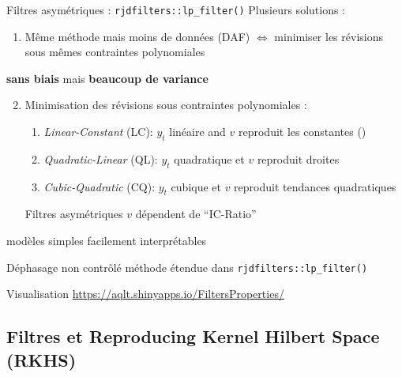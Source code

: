 \documentclass[10pt,xcolor=table,color={dvipsnames,usenames},ignorenonframetext,usepdftitle=false,french]{beamer}
\providecommand{\tightlist}{%
  \setlength{\parskip}{0pt}
  }
\newcommand\1{\mathds{1}}
\begin{document}
\begin{frame}[fragile]{Filtres asymétriques :
\texttt{rjdfilters::lp\_filter()}}
\protect\hypertarget{filtres-asymuxe9triques-rjdfilterslp_filter}{}
Plusieurs solutions :

\begin{enumerate}
\tightlist
\item
  Même méthode mais moins de données (DAF) \(\iff\) minimiser les
  révisions sous mêmes contraintes polynomiales
\end{enumerate}

\faArrowCircleRight{} \textbf{sans biais} mais \textbf{beaucoup de
variance}

\pause

\begin{enumerate}
\setcounter{enumi}{1}
\item
  Minimisation des révisions sous contraintes polynomiales :

  \begin{enumerate}
  \item
    \emph{Linear-Constant} (LC): \(y_t\) linéaire and \(v\) reproduit
    les constantes ()
  \item
    \emph{Quadratic-Linear} (QL): \(y_t\) quadratique et \(v\) reproduit
    droites
  \item
    \emph{Cubic-Quadratic} (CQ): \(y_t\) cubique et \(v\) reproduit
    tendances quadratiques
  \end{enumerate}

  \faArrowCircleRight{} Filtres asymétriques \(v\) dépendent de
  ``IC-Ratio''
\end{enumerate}

\pause

\bcsmbh modèles simples facilement interprétables

\bcsmmh Déphasage non contrôlé \faArrowCircleRight{} méthode étendue
dans \texttt{rjdfilters::lp\_filter()}

\pause

\faDesktop{} Visualisation
\url{https://aqlt.shinyapps.io/FiltersProperties/}
\end{frame}

\hypertarget{filtres-et-reproducing-kernel-hilbert-space-rkhs}{%
\subsection{Filtres et Reproducing Kernel Hilbert Space
(RKHS)}\label{filtres-et-reproducing-kernel-hilbert-space-rkhs}}
\end{document}
